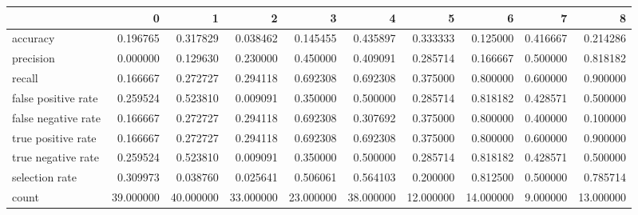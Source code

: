 \begin{tabular}{lrrrrrrrrr}
\toprule
{} &          0 &          1 &          2 &          3 &          4 &          5 &          6 &         7 &          8 \\
\midrule
accuracy            &   0.196765 &   0.317829 &   0.038462 &   0.145455 &   0.435897 &   0.333333 &   0.125000 &  0.416667 &   0.214286 \\
precision           &   0.000000 &   0.129630 &   0.230000 &   0.450000 &   0.409091 &   0.285714 &   0.166667 &  0.500000 &   0.818182 \\
recall              &   0.166667 &   0.272727 &   0.294118 &   0.692308 &   0.692308 &   0.375000 &   0.800000 &  0.600000 &   0.900000 \\
false positive rate &   0.259524 &   0.523810 &   0.009091 &   0.350000 &   0.500000 &   0.285714 &   0.818182 &  0.428571 &   0.500000 \\
false negative rate &   0.166667 &   0.272727 &   0.294118 &   0.692308 &   0.307692 &   0.375000 &   0.800000 &  0.400000 &   0.100000 \\
true positive rate  &   0.166667 &   0.272727 &   0.294118 &   0.692308 &   0.692308 &   0.375000 &   0.800000 &  0.600000 &   0.900000 \\
true negative rate  &   0.259524 &   0.523810 &   0.009091 &   0.350000 &   0.500000 &   0.285714 &   0.818182 &  0.428571 &   0.500000 \\
selection rate      &   0.309973 &   0.038760 &   0.025641 &   0.506061 &   0.564103 &   0.200000 &   0.812500 &  0.500000 &   0.785714 \\
count               &  39.000000 &  40.000000 &  33.000000 &  23.000000 &  38.000000 &  12.000000 &  14.000000 &  9.000000 &  13.000000 \\
\bottomrule
\end{tabular}
